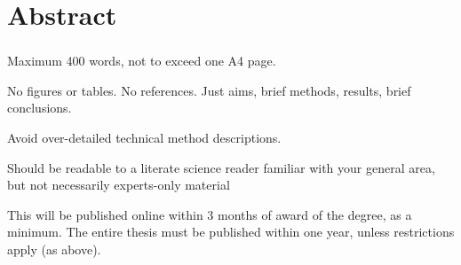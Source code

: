 \chapter*{Abstract} 
\subsection*{\thesistitle}

Maximum 400 words, not to exceed one A4 page. 

No figures or tables.  No references.  Just aims, brief methods, results, brief conclusions.

Avoid over-detailed technical method descriptions.

Should be readable to a literate science reader familiar with your general area, but not necessarily experts-only material

This will be published online within 3 months of award of the degree, as a minimum.  The entire thesis must be published within one year, unless restrictions apply (as above).